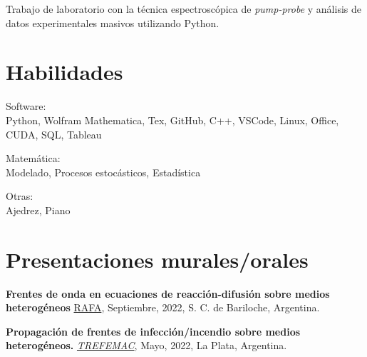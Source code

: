 \documentclass[a4paper,10pt]{article}
\begin{document}
\begin{adjustbox}{valign=t}
\begin{minipage}{0.5\textwidth}
\begin{description}
Trabajo de laboratorio con la técnica espectroscópica de \textit{pump-probe} y análisis de datos experimentales masivos utilizando Python.\;

\end{description}

\vspace*{-.9cm}
\section*{Habilidades}
\begin{description}
    \item \textcolor{ColorOne}{Software:} \\ Python, Wolfram Mathematica, Tex, GitHub, C++, VSCode, Linux, Office, CUDA, SQL, Tableau \vspace*{-.3cm}
    \item \textcolor{ColorOne}{Matemática:} \\ Modelado, Procesos estocásticos, Estadística \vspace*{-.3cm}
    \item \textcolor{ColorOne}{Otras:} \\ Ajedrez, Piano
\end{description}

\vspace*{-.9cm}
\section*{Presentaciones murales/orales}
\begin{description}
	\raggedright
	\item [-] \textbf{Frentes de onda en ecuaciones de reacción-difusión sobre medios heterogéneos} \href{https://rafa2022.fisica.org.ar/}{RAFA}, Septiembre, 2022, S. C. de Bariloche, Argentina.
	
	\item [-] \textbf{Propagación de frentes de infección/incendio sobre medios heterogéneos.} 
    {\href{https://sites.google.com/view/trefemac2022}{\it TREFEMAC}}, Mayo, 2022, La Plata, Argentina.

\end{description}

\vspace*{-.9cm}

\end{minipage}
\end{adjustbox}
\end{document}
